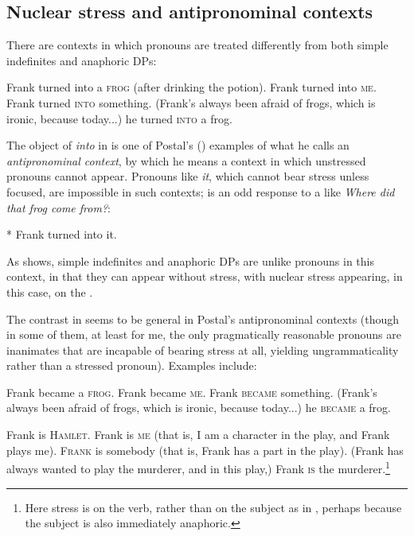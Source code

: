 \documentclass[output=paper]{LSP/langsci}
\begin{document}
\subsection{Nuclear stress and antipronominal contexts}

There are contexts in which pronouns are treated differently from both simple indefinites and anaphoric DPs:


\ea%
    \label{ex:richards:16bis}
\ea Frank turned into a \textsc{frog} (after drinking the potion).
\ex Frank turned into \textsc{me}.
\ex Frank turned \textsc{into} something.
\ex (Frank's always been afraid of frogs, which is ironic, because today...)       he turned \textsc{into} a frog.
\z
\z

The object of \textit{into} in  is one of Postal's (\citeyear{Postal1994,Postal1998,Postal2001}) examples of what he calls an \textit{antipronominal context}, by which he means a context in which unstressed pronouns cannot appear.  Pronouns like \textit{it}, which cannot bear stress unless focused, are impossible in such contexts;  is an odd response to a  like  \textit{Where did that frog come from?}:


\ea%
    \label{ex:richards:17}
       *  Frank turned into it.
\z

As  shows, simple indefinites and anaphoric DPs are unlike pronouns in this context, in that they can appear without stress, with nuclear stress appearing, in this case, on the .  

  The contrast in  seems to be general in Postal's antipronominal contexts (though in some of them, at least for me, the only pragmatically reasonable pronouns are inanimates that are incapable of bearing stress at all, yielding ungrammaticality rather than a stressed pronoun).  Examples include:


\ea%
\label{ex:richards:18}
\ea Frank became a \textsc{frog}.
\ex Frank became \textsc{me}.
\ex Frank \textsc{became} something.
\ex (Frank's always been afraid of frogs, which is ironic, because today...)       he \textsc{became} a frog.
\z
\z

\ea%
    \label{ex:richards:19}
\ea Frank is \textsc{Hamlet}.
\ex Frank is \textsc{me} (that is, I am a character in the play, and Frank plays me).
\ex \label{ex:richards:19c} \textsc{Frank} is somebody (that is, Frank has a part in the play).
\ex (Frank has always wanted to play the murderer, and in this play,)       Frank \textsc{is} the murderer.\footnote{Here stress is on the verb, rather than on the subject as in , perhaps because the subject is also immediately anaphoric.} 
\z
\z
\end{document}
